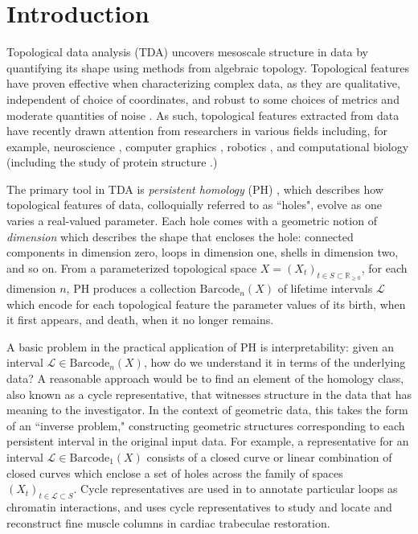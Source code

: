 \documentclass[11pt,onecolumn]{article}
\newcommand{\R}{\mathbb{R}}
\newcommand{\barcode}{\mathrm{Barcode}}
\newcommand{\persinterval}{\mathcal{L}}
\theoremstyle{plain}
\theoremstyle{definition}
\begin{document}
\section{Introduction}
\label{intro}

Topological data analysis (TDA) uncovers 
mesoscale structure in data by quantifying its shape using methods from algebraic topology. 
Topological features have proven effective when characterizing complex data, as they are qualitative, independent of choice of coordinates, and robust to some choices of metrics and moderate quantities of noise \cite{ghrist2014elementary,Carlsson2009TopologyAD}. 
As such, topological features extracted from data have recently drawn attention from researchers in various fields including, for example, neuroscience \cite{giusti2016two, bendich2016persistent, robert}, computer graphics \cite{pointcloud-topo, singh2007topological}, robotics \cite{pathplanning, VASUDEVAN20113292},  and computational biology \cite{collectivemotion, selectingbiologicalexperiments/journal.pone.0213679, zebrafish} (including the study of protein structure   \cite{ Usingpersistenthomologyanddynamicaldistancestoanalyzeproteinbinding,xia2016multiscale,xia2014persistent}.)  

The primary tool in TDA is \textit{persistent homology} (PH) \cite{Ghrist08}, which describes how topological features of data, colloquially referred to as ``holes", evolve as one varies a real-valued parameter. Each hole comes with a geometric notion of  \emph{dimension} which describes the shape that encloses the hole: connected components in dimension zero, loops in dimension one, shells in dimension two, and so on. From a parameterized topological space $X = (X_t)_{t \in S \subset \R_{\ge 0}}$, for each dimension $n$, PH produces a collection $\barcode_n(X)$ of lifetime intervals $\persinterval$ which encode for each topological feature the parameter values of its birth, when it first appears, and death, when it no longer remains.

A basic problem in the practical application of PH is interpretability: given an interval $\persinterval \in \barcode_n(X)$, how do we understand it in terms of the underlying data? A reasonable approach would be to find an element of the homology class, also known as a cycle representative, that  witnesses structure in the data that has meaning to the investigator. In the context of geometric data, this takes the form of an ``inverse problem,"  constructing  geometric structures corresponding to each persistent interval in the original input data.
For example, a representative for an interval $\persinterval \in \barcode_1(X)$ consists of a closed curve or linear combination of closed curves which enclose a set of holes across the family of spaces $(X_t)_{t \in \persinterval \subset S}$. Cycle representatives are used in \cite{emmett2015multiscale} to annotate particular loops as chromatin interactions, and  \cite{wu} uses cycle representatives to study and locate and reconstruct fine muscle columns in  cardiac trabeculae restoration.
\end{document}
